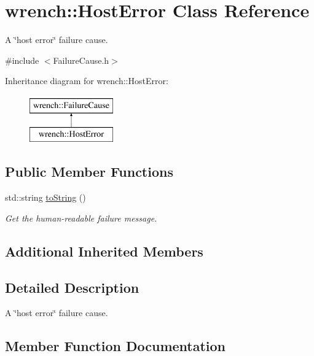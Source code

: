 \hypertarget{classwrench_1_1_host_error}{}\section{wrench\+:\+:Host\+Error Class Reference}
\label{classwrench_1_1_host_error}


A \char`\"{}host error\char`\"{} failure cause.  




{\ttfamily \#include $<$Failure\+Cause.\+h$>$}

Inheritance diagram for wrench\+:\+:Host\+Error\+:\begin{figure}[H]
\begin{center}
\leavevmode
\includegraphics[height=2.000000cm]{classwrench_1_1_host_error}
\end{center}
\end{figure}
\subsection*{Public Member Functions}
\begin{DoxyCompactItemize}
\item 
std\+::string \hyperlink{classwrench_1_1_host_error_adacb96198ee8477b67fcac9ff8638266}{to\+String} ()
\begin{DoxyCompactList}\small\item\em Get the human-\/readable failure message. \end{DoxyCompactList}\end{DoxyCompactItemize}
\subsection*{Additional Inherited Members}


\subsection{Detailed Description}
A \char`\"{}host error\char`\"{} failure cause. 

\subsection{Member Function Documentation}
\mbox{\label{classwrench_1_1_host_error_adacb96198ee8477b67fcac9ff8638266}} 
